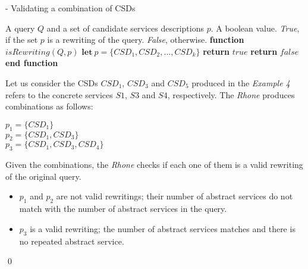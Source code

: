 \begin{algorithm}[h!]
\caption{ - Validating a combination of CSDs}
\label{isrewriting}
\begin{algorithmic}[1]
\REQUIRE A query $Q$ and a set of candidate services descriptions $p$.
\ENSURE A boolean value. \textit{True}, if the set $p$ is a rewriting of the query. \textit{False}, otherwise.
\STATE \textbf{function} $\mathit{isRewriting} (Q, p)$
\STATE  $\mathbf{let} \ p = \lbrace CSD_{1}, CSD_{2}, ..., CSD_{k} \rbrace$
	\STATE \textbf{return} $true$		
\ENDIF
\STATE \textbf{return} $false$
\STATE \textbf{end function}
\end{algorithmic}
\end{algorithm}

\begin{example}%
Let us consider the CSDs $CSD_{1}$, $CSD_{3}$ and $CSD_{5}$ produced in the \textit{Example 4} refers to the concrete services $S1$, $S3$ and $S4$, respectively. The \textit{Rhone} produces combinations as follows:
\begin{flushleft}
$p_{1} = \lbrace CSD_{1} \rbrace$ \\
$p_{2} = \lbrace CSD_{1}, CSD_{3} \rbrace$ \\
$p_{3} = \lbrace CSD_{1}, CSD_{3}, CSD_{4} \rbrace$
\end{flushleft}
Given the combinations, the \textit{Rhone} checks if each one of them is a valid
rewriting of the original query.
\begin{itemize}
\item $p_{1}$ and $p_{2}$ are not valid rewritings; their number of abstract services do not match with the number of abstract services in the query.
\item $p_{3}$ is a valid rewriting; the number of abstract services matches and there is no repeated abstract service. 
\end{itemize}
\qed
\end{example}